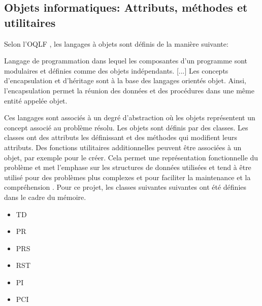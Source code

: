     \subsection{Objets informatiques: Attributs, méthodes et utilitaires}\label{ssec:obj-informatique-impl-stat}
            Selon l'\ac{OQLF} \parencite{oqlf_langage_2006}, les langages à objets sont définis de la manière suivante: 
            \begin{definition}
                Langage de programmation dans lequel les composantes d'un programme sont modulaires et définies comme des objets indépendants. [...] Les concepts d'encapsulation et d'héritage sont à la base des langages orientés objet. Ainsi, l'encapsulation permet la réunion des données et des procédures dans une même entité appelée objet.
            \end{definition}
            Ces langages sont associés à un degré d'abstraction où les objets représentent un concept associé au problème résolu. Les objets sont définis par des classes. Les classes ont des attributs les définissant et des méthodes qui modifient leurs attributs. Des fonctions utilitaires additionnelles peuvent être associées à un objet, par exemple pour le créer. Cela permet une représentation fonctionnelle du problème et met l'emphase sur les structures de données utilisées et tend à être utilisé pour des problèmes plus complexes et pour faciliter la maintenance et la compréhension \parencite{lawhead_learning_2023}. Pour ce projet, les classes suivantes suivantes ont été définies dans le cadre du mémoire.
            \begin{itemize}
                \item \acf{TD}
                \item \acf{PR}
                \item \acf{PRS}
                \item \acf{RST}
                \item \acf{PI}
                \item \acf{PCI}
            \end{itemize}
            \clearpage
